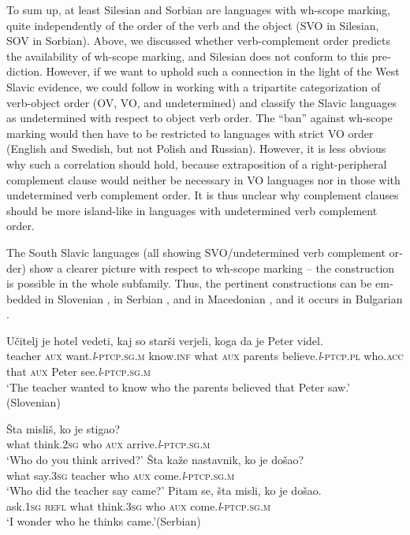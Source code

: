 \documentclass[output=paper,colorlinks,citecolor=brown]{langscibook}
\begin{document}
\begin{otherlanguage}{english}
\noindent To sum up, at least Silesian and Sorbian are languages with wh-scope marking, quite independently of the order of the verb and the object (SVO in Silesian, SOV in Sorbian). Above, we discussed whether verb-complement order predicts the availability of wh-scope marking, and Silesian does not conform to this prediction. However, if we want to uphold such a connection in the light of the West Slavic evidence, we could follow \citet{Haider2012} in working with a tripartite categorization of verb-object order (OV, VO, and undetermined) and classify the Slavic languages as undetermined with respect to object verb order. The “ban” against wh-scope marking would then have to be restricted to languages with strict VO order (English and Swedish, but not Polish and Russian). However, it is less obvious why such a correlation should hold, because extraposition of a right-peripheral complement clause would neither be necessary in VO languages nor in those with undetermined verb complement order. It is thus unclear why complement clauses should be more island-like in languages with undetermined verb complement order.

The South Slavic languages (all showing SVO/undetermined verb complement order) show a clearer picture with respect to wh-scope marking -- the construction is possible in the whole subfamily. Thus, the pertinent constructions can be embedded in Slovenian , in Serbian , and in Macedonian , and it occurs in Bulgarian .

\ea \label{ex:fanselow:22}
\gll  Učitelj 	je 	hotel 	vedeti, 	kaj 	so 	starši 	verjeli, 	koga 	da 	je Peter 	videl.\\
     teacher 	\textsc{aux} 	want.\textit{l}-\textsc{ptcp}.\textsc{sg}.\textsc{m} 	know.\textsc{inf} 	what 	\textsc{aux} 	parents 	believe.\textit{l}-\textsc{ptcp}.\textsc{pl} 	who.\textsc{acc} 	that	\textsc{aux}  Peter 	see.\textit{l}-\textsc{ptcp}.\textsc{sg}.\textsc{m} \\
    \glt    ‘The teacher wanted to know who the parents believed that Peter saw.' \\\hfill (Slovenian)
    \z

\ea\label{ex:fanselow:23}
\ea     
\gll Šta 	misliš, 	ko 	je 	stigao?  \\
     what 	think.2\textsc{sg} 	who 	\textsc{aux} 	arrive.\textit{l}-\textsc{ptcp}.\textsc{sg}.\textsc{m} \\
\glt ‘Who do you think arrived?'
\label{ex:fanselow:23a}
\ex     
\gll Šta 	kaže 	nastavnik, 	ko 	je 	došao? \\
    what 	say.3\textsc{sg} 	teacher 	who 	\textsc{aux} 	come.\textit{l}-\textsc{ptcp}.\textsc{sg}.\textsc{m} \\
\glt ‘Who did the teacher say came?'
\label{ex:fanselow:23b}
\ex     
\gll Pitam 	se, 	šta 	misli, 	ko 	je 	došao. \\
ask.1\textsc{sg} 	\textsc{refl} 	what 	think.3\textsc{sg} 	who 	\textsc{aux} 	come.\textit{l}-\textsc{ptcp}.\textsc{sg}.\textsc{m} \\
\glt ‘I wonder who he thinks came.'\hfill (Serbian)
\z\z


\end{otherlanguage}
\end{document}
